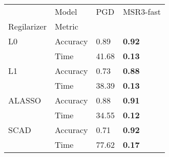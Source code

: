 \begin{tabular}{llll}
\toprule
     & Model &    PGD & MSR3-fast \\
Regilarizer & Metric &        &           \\
\midrule
L0 & Accuracy &   0.89 &      \textbf{0.92} \\
     & Time &  41.68 &      \textbf{0.13} \\
L1 & Accuracy &   0.73 &      \textbf{0.88} \\
     & Time &  38.39 &      \textbf{0.13} \\
ALASSO & Accuracy &   0.88 &      \textbf{0.91} \\
     & Time &  34.55 &      \textbf{0.12} \\
SCAD & Accuracy &   0.71 &      \textbf{0.92} \\
     & Time &  77.62 &      \textbf{0.17} \\
\bottomrule
\end{tabular}
